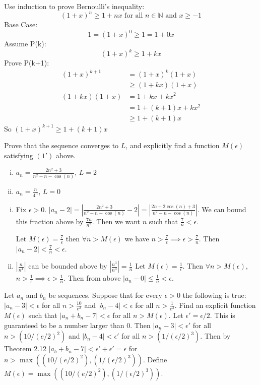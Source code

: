 \documentclass[paper=a4, fontsize=11pt]{jhwhw} %
\begin{document}
Use induction to prove Bernoulli's inequality:
$$(1 + x)^n \ge 1 + nx\text{ for all }n\in \mathbb N\text{ and } x\ge -1$$
\solution
Base Case:
$$1 = (1+x)^0 \ge 1 = 1 + 0x$$
Assume P(k):
$$(1+x)^k \ge 1 + kx$$
Prove P(k+1):
\begin{align}
    (1 + x)^{k+1} &= (1+x)^k(1+x)\\
                  &\ge (1 + kx)(1+x)\\
    (1 + kx)(1+x) &= 1 + kx + kx^2\\
                  &= 1 + (k+1)x + kx^2\\
                  &\ge 1 + (k+1)x
\end{align}
So $(1+x)^{k+1} \ge 1 + (k + 1)x$

Prove that the sequence converges to $L$, and explicitly find a function $M(\epsilon)$ satisfying $(1')$ above.
\begin{enumerate}[(i)]
    \item $a_n = \frac{2n^2 + 3}{n^2 - n - \cos(n)}$, $L = 2$
    \item $a_n = \frac{n}{4^n}$, $L = 0$
\end{enumerate}
\solution
\begin{enumerate}[(i)]
    \item Fix $\epsilon > 0$. $|a_n - 2| = \left|\frac{2n^2 + 3}{n^2 - n - \cos(n)} - 2\right| = \left|\frac{2n + 2\cos(n) + 3}{n^2-n-\cos(n)}\right|$. We can bound this fraction above by $\frac{7n}{n^2}$. Then we want $n$ such that $\frac{7}{n} < \epsilon$. 

            Let $M(\epsilon) = \frac{7}{\epsilon}$ then $\forall n > M(\epsilon)$ we have $n > \frac{7}{\epsilon} \implies \epsilon > \frac{7}{n}$. Then $|a_n - 2| < \frac{7}{n} < \epsilon$.

        \item $\left|\frac{n}{n^4}\right|$ can be bounded above by $\left|\frac{n^3}{n^4}\right| = \frac{1}{n}$ Let $M(\epsilon) = \frac{1}{\epsilon}$. Then $\forall n > M(\epsilon)$, $n > \frac{1}{\epsilon} \implies \epsilon > \frac{1}{n}$. Then from above $|a_n - 0| \le \frac{1}{n} < \epsilon$.
\end{enumerate}

Let ${a_n}$ and ${b_n}$ be sequences. Suppose that for every $\epsilon > 0$ the following is true: $|a_n - 3| < \epsilon$ for all $n > \frac{10}{e^2}$ and $|b_n - 4| < \epsilon$ for all $n> \frac{1}{e^3}$. Find an explicit function $M(\epsilon)$ such that $|a_n + b_n - 7| < \epsilon$ for all $n > M(\epsilon)$. 
\solution
Let $\epsilon' = \epsilon/2$. This is guaranteed to be a number larger than 0. Then $|a_n - 3| < \epsilon'$ for all $n > (10/(e/2)^2)$ and $|b_n - 4| < \epsilon'$ for all $n > (1/(\epsilon/2)^3)$. Then by Theorem 2.12 $|a_b + b_n - 7| < \epsilon' + \epsilon' = \epsilon$ for $n > \max((10/(e/2)^2), (1/(\epsilon/2)^3))$. Define $M(\epsilon) = \max((10/(e/2)^2), (1/(\epsilon/2)^3))$.
\end{document}
